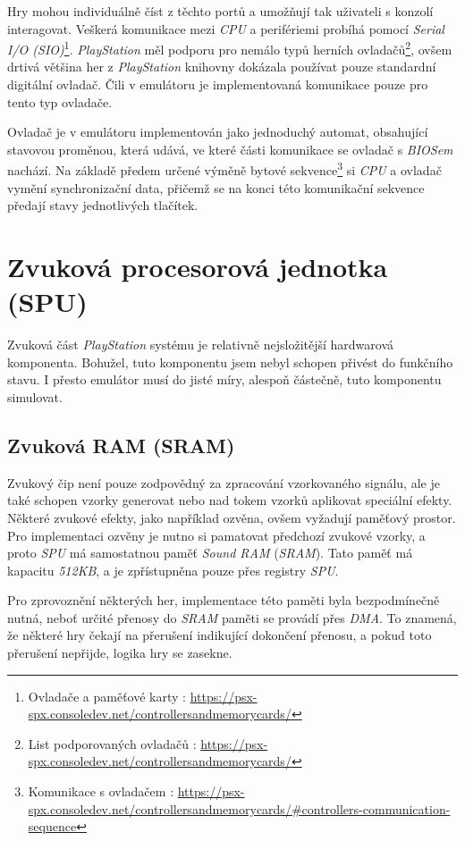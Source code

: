 Hry mohou individuálně číst z těchto portů a umožňují tak uživateli s konzolí interagovat. 
Veškerá komunikace mezi \textit{CPU} a perifériemi probíhá pomocí \textit{Serial I/O (SIO)}\footnote{Ovladače a paměťové karty \cite{PSXSpec}: \url{https://psx-spx.consoledev.net/controllersandmemorycards/}}.
\textit{PlayStation} měl podporu pro nemálo typů herních ovladačů\footnote{List podporovaných ovladačů \cite{PSXSpec}: \url{https://psx-spx.consoledev.net/controllersandmemorycards/}}, 
ovšem drtivá většina her z \textit{PlayStation} knihovny dokázala používat pouze standardní digitální ovladač.
Čili v emulátoru je implementovaná komunikace pouze pro tento typ ovladače.

Ovladač je v emulátoru implementován jako jednoduchý automat, obsahující stavovou proměnou, která udává, ve které části komunikace se ovladač s \textit{BIOSem} nachází. Na základě
předem určené výměně bytové sekvence\footnote{Komunikace s ovladačem \cite{PSXSpec}: \url{https://psx-spx.consoledev.net/controllersandmemorycards/\#controllers-communication-sequence}} si \textit{CPU} a ovladač vymění synchronizační data, přičemž se na konci této komunikační sekvence předají stavy jednotlivých tlačítek.

\section{Zvuková procesorová jednotka (SPU)}

Zvuková část \textit{PlayStation} systému je relativně nejsložitější hardwarová komponenta. Bohužel, tuto komponentu jsem nebyl schopen přivést
do funkčního stavu. I přesto emulátor musí do jisté míry, alespoň částečně, tuto komponentu simulovat.

\subsection{Zvuková RAM (SRAM)}

Zvukový čip není pouze zodpovědný za zpracování vzorkovaného signálu, ale je také schopen vzorky generovat nebo nad tokem vzorků aplikovat
speciální efekty. Některé zvukové efekty, jako například ozvěna, ovšem vyžadují paměťový prostor. Pro implementaci ozvěny je nutno si pamatovat
předchozí zvukové vzorky, a proto \textit{SPU} má samostatnou paměť \textit{Sound RAM} (\textit{SRAM}). Tato paměť má kapacitu \textit{512KB}, a je zpřístupněna pouze
přes registry \textit{SPU}.

Pro zprovoznění některých her, implementace této paměti byla bezpodmínečně nutná, neboť určité přenosy do \textit{SRAM} paměti se provádí přes
\textit{DMA}. To znamená, že některé hry čekají na přerušení indikující dokončení přenosu, a pokud toto přerušení nepřijde, logika hry se zasekne.

